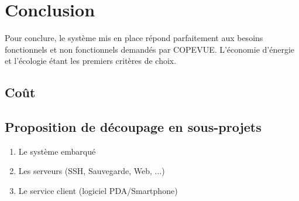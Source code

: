 \section{Conclusion}

Pour conclure, le système mis en place répond parfaitement aux besoins 
fonctionnels et non fonctionnels demandés par COPEVUE. L'économie d'énergie et 
l'écologie étant les premiers critères de choix.

\subsection{Coût}



\subsection{Proposition de découpage en sous-projets}

\begin{enumerate}
\item Le système embarqué
\item Les serveurs (SSH, Sauvegarde, Web, ...)
\item Le service client (logiciel PDA/Smartphone) 
\end {enumerate}

